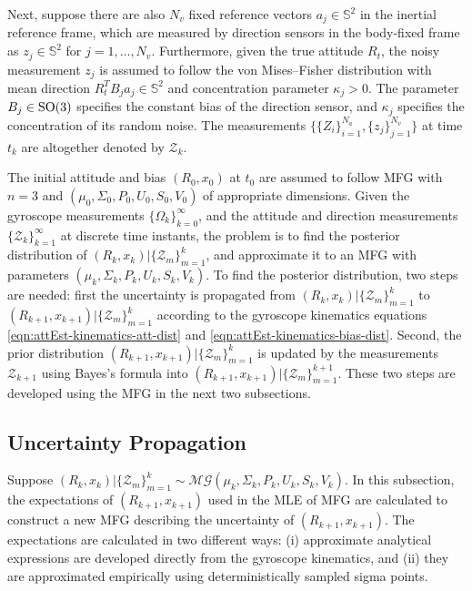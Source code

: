 Next, suppose there are also $N_v$ fixed reference vectors ${a}_j\in\mathbb{S}^2$ in the inertial reference frame, which are measured by direction sensors in the body-fixed frame as ${z}_j\in\mathbb{S}^2$ for $j=1,\ldots,N_v$.
Furthermore, given the true attitude $R_t$, the noisy measurement ${z}_j$ is assumed to follow the von Mises--Fisher distribution \cite{mardia2009directional} with mean direction $R_t^TB_j{a}_j\in\mathbb{S}^2$ and concentration parameter $\kappa_j>0$.
The parameter $B_j\in\mathrm{SO}(3)$ specifies the constant bias of the direction sensor, and $\kappa_j$ specifies the concentration of its random noise.
The measurements $\Big\{\{Z_i\}_{i=1}^{N_a}, \{z_j\}_{j=1}^{N_v}\Big\}$ at time $t_k$ are altogether denoted by $\mathcal{Z}_k$.

The initial attitude and bias $(R_0,x_0)$ at $t_0$ are assumed to follow MFG with $n=3$ and $(\mu_0, \Sigma_0, P_0, U_0, S_0, V_0)$ of appropriate dimensions.
Given the gyroscope measurements $\{\Omega_k\}_{k=0}^\infty$, and the attitude and direction measurements $\{\mathcal{Z}_k\}_{k=1}^\infty$ at discrete time instants, the problem is to find the posterior distribution of $(R_k,x_k) | \{\mathcal{Z}_m\}_{m=1}^k$, and approximate it to an MFG with parameters $(\mu_k, \Sigma_k, P_k, U_k, S_k, V_k)$.
To find the posterior distribution, two steps are needed: first the uncertainty is propagated from $(R_k,x_k) | \{\mathcal{Z}_m\}_{m=1}^k$ to $(R_{k+1},x_{k+1}) | \{\mathcal{Z}_m\}_{m=1}^k$ according to the gyroscope kinematics equations \eqref{eqn:attEst-kinematics-att-dist} and \eqref{eqn:attEst-kinematics-bias-dist}.
Second, the prior distribution $(R_{k+1},x_{k+1}) | \{\mathcal{Z}_m\}_{m=1}^k$ is updated by the measurements $\mathcal{Z}_{k+1}$ using Bayes's formula into $(R_{k+1},x_{k+1}) | \{\mathcal{Z}_m\}_{m=1}^{k+1}$.
These two steps are developed using the MFG in the next two subsections.

\subsection{Uncertainty Propagation} \label{section:attEst-propagation}

Suppose $(R_k,x_k) | \{\mathcal{Z}_m\}_{m=1}^k \sim\mathcal{MG}(\mu_k, \Sigma_k, P_k, U_k, S_k, V_k)$. 
In this subsection, the expectations of $(R_{k+1},x_{k+1})$ used in the MLE of MFG are calculated to construct a new MFG describing the uncertainty of $(R_{k+1},x_{k+1})$.
The expectations are calculated in two different ways: (i) approximate analytical expressions are developed directly from the gyroscope kinematics, and (ii) they are approximated empirically using deterministically sampled sigma points.

